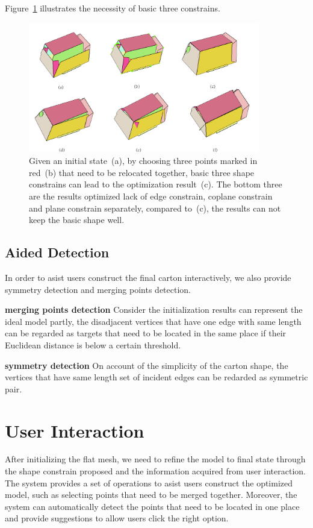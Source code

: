 \documentclass[submission]{gmp2018}
\begin{document}
Figure~\ref{fig:constrain} illustrates the necessity of basic three constrains.

\begin{figure}
	\centering
	\includegraphics[width=0.9\textwidth]{images/constrain.jpg}
	\caption{Given an initial state~(a), by choosing three points marked in red~(b) that need to be relocated together, basic three shape constrains can lead to the optimization result~(c). The bottom three are the results optimized lack of edge constrain, coplane constrain and plane constrain separately, compared to~(c), the results can not keep the basic shape well.}
	\label{fig:constrain}
\end{figure}


\subsection{Aided Detection}
In order to asist users construct the final carton interactively, we also provide symmetry detection and merging points detection.

\noindent
\textbf{merging points detection} Consider the initialization results can represent the ideal model partly, the disadjacent vertices that have one edge with same length can be regarded as targets that need to be located in the same place if their Euclidean distance is below a certain threshold.

\noindent
\textbf{symmetry detection} On account of the simplicity of the carton shape, the vertices that have same length set of incident edges can be redarded as symmetric pair.


\section{User Interaction}\label{sec:interaction}
After initializing the flat mesh, we need to refine the model to final state through the shape constrain proposed and the information acquired from user interaction. The system provides a set of operations to asist users construct the optimized model, such as selecting points that need to be merged together. Moreover, the system can automatically detect the points that need to be located in one place and provide suggestions to allow users click the right option.
\end{document}

